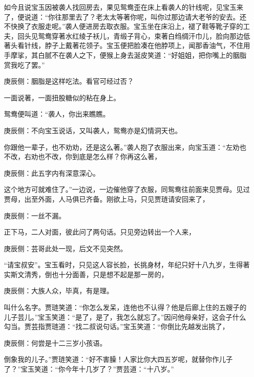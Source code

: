 \begin{parag}
    如今且说宝玉因被袭人找回房去，果见鸳鸯歪在床上看袭人的针线呢，见宝玉来了，便说道：“你往那里去了？老太太等著你呢，叫你过那边请大老爷的安去。还不快换了衣服走呢。”袭人便进房去取衣服。宝玉坐在床沿上，褪了鞋等靴子穿的工夫，回头见鸳鸯穿著水红绫子袄儿，青缎子背心，束著白绉绸汗巾儿，脸向那边低著头看针线，脖子上戴著花领子。宝玉便把脸凑在他脖项上，闻那香油气，不住用手摩挲，其白腻不在袭人之下，便猴上身去涎皮笑道：“好姐姐，把你嘴上的胭脂赏我吃了罢。”\begin{note}庚辰侧：胭脂是这样吃法。看官可经过否？\end{note}一面说著，一面扭股糖似的粘在身上。
\end{parag}


\begin{parag}
    鸳鸯便叫道：“袭人，你出来瞧瞧。\begin{note}庚辰侧：不向宝玉说话，又叫袭人，鸳鸯亦是幻情洞天也。\end{note}你跟他一辈子，也不劝劝，还是这么著。”袭人抱了衣服出来，向宝玉道：“左劝也不改，右劝也不改，你到底是怎么样？你再这么著，\begin{note}庚辰侧：此五字内有深意深心。\end{note}这个地方可就难住了。”一边说，一边催他穿了衣服，同鸳鸯往前面来见贾母。见过贾母，出至外面，人马俱已齐备。刚欲上马，只见贾琏请安回来了，\begin{note}庚辰侧：一丝不漏。\end{note}正下马，二人对面，彼此问了两句话。只见旁边转出一个人来，\begin{note}庚辰侧：芸哥此处一现，后文不见突然。\end{note}“请宝叔安”。宝玉看时，只见这人容长脸，长挑身材，年纪只好十八九岁，生得著实斯文清秀，倒也十分面善，只是想不起是那一房的，\begin{note}庚辰侧：大族人众，毕真，有是理。\end{note}叫什么名字。贾琏笑道：“你怎么发呆，连他也不认得？他是后廊上住的五嫂子的儿子芸儿。”宝玉笑道：“是了，是了，我怎么就忘了。”因问他母亲好，这会子什么勾当。贾芸指贾琏道：“找二叔说句话。”宝玉笑道：“你倒比先越发出挑了，\begin{note}庚辰侧：何尝是十二三岁小孩语。\end{note}倒象我的儿子。”贾琏笑道：“好不害臊！人家比你大四五岁呢，就替你作儿子了？”宝玉笑道：“你今年十几岁了？”贾芸道：“十八岁。”
\end{parag}


